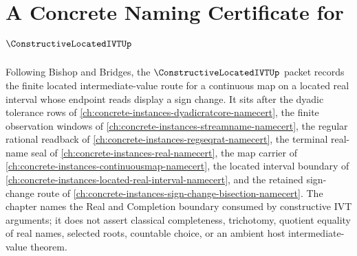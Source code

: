 \chapter{A Concrete Naming Certificate for $\ConstructiveLocatedIVTUp$}
\label{ch:concrete-instances-constructive-located-ivt-namecert}

Following Bishop and Bridges, the $\ConstructiveLocatedIVTUp$ packet records the finite located intermediate-value route for a continuous map on a located real interval whose endpoint reads display a sign change. It sits after the dyadic tolerance rows of \autoref{ch:concrete-instances-dyadicratcore-namecert}, the finite observation windows of \autoref{ch:concrete-instances-streamname-namecert}, the regular rational readback of \autoref{ch:concrete-instances-regseqrat-namecert}, the terminal real-name seal of \autoref{ch:concrete-instances-real-namecert}, the map carrier of \autoref{ch:concrete-instances-continuousmap-namecert}, the located interval boundary of \autoref{ch:concrete-instances-located-real-interval-namecert}, and the retained sign-change route of \autoref{ch:concrete-instances-sign-change-bisection-namecert}. The chapter names the Real and Completion boundary consumed by constructive IVT arguments; it does not assert classical completeness, trichotomy, quotient equality of real names, selected roots, countable choice, or an ambient host intermediate-value theorem.

